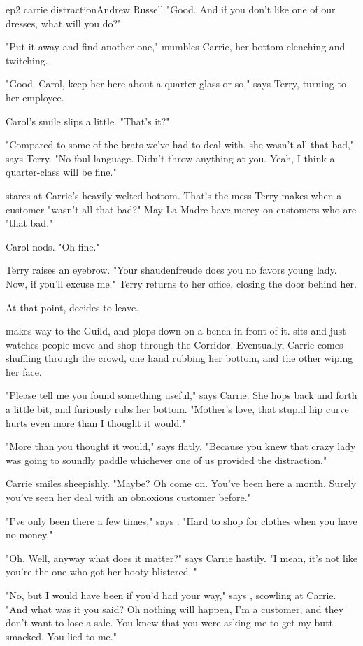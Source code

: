 \documentclass{book}
\begin{document}
\begin{childnode}{ep2 carrie distraction}{Andrew Russell}
    "Good. And if you don't like one of our dresses, what will you do?"

    "Put it away and find another one," mumbles Carrie, her bottom clenching and twitching.

    "Good. Carol, keep her here about a quarter-glass or so," says Terry, turning to her employee.

    Carol's smile slips a little. "That's it?"

    "Compared to some of the brats we've had to deal with, she wasn't all that bad," says Terry. "No foul language. Didn't throw anything at you. Yeah, I think a quarter-class will be fine."

    \name{} stares at Carrie's heavily welted bottom. That's the mess Terry makes when a customer "wasn't all that bad?" May La Madre have mercy on customers who are "that bad."

    Carol nods. "Oh fine."

    Terry raises an eyebrow. "Your shaudenfreude does you no favors young lady. Now, if you'll excuse me." Terry returns to her office, closing the door behind her.

    At that point, \name{} decides to leave.

    \name{} makes \hisher{} way to the Guild, and plops down on a bench in front of it. \HeShe{} sits and just watches people move and shop through the Corridor. Eventually,
    Carrie comes shuffling through the crowd, one hand rubbing her bottom, and the other wiping her face.

    "Please tell me you found something useful," says Carrie. She hops back and forth a little bit, and furiously rubs her bottom. "Mother's love, that stupid hip curve hurts even more 
    than I thought it would."

    "More than you thought it would," says \name{} flatly. "Because you knew that crazy lady was going to soundly paddle whichever one of us provided the distraction."

    Carrie smiles sheepishly. "Maybe? Oh come on. You've been here a month. Surely you've seen her deal with an obnoxious customer before."

    "I've only been there a few times," says \name{}. "Hard to shop for clothes when you have no money."

    "Oh. Well, anyway what does it matter?" says Carrie hastily. "I mean, it's not like you're the one who got her booty blistered--"

    "No, but I would have been if you'd had your way," says \name{}, scowling at Carrie. "And what was it you said? Oh nothing will happen, I'm a customer, and they don't want to lose a sale. You 
    knew that you were asking me to get my butt smacked. You lied to me."


\end{childnode}
\end{document}
